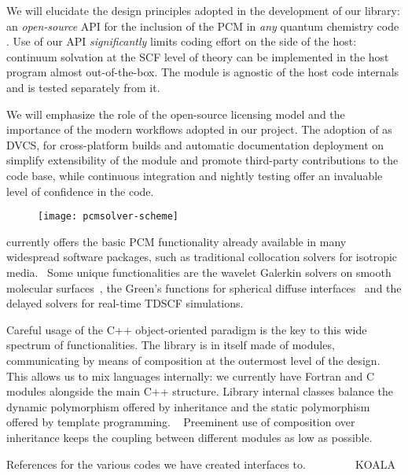We will elucidate the design principles adopted in the development of our
\pcmsolver library: an \emph{open-source} \acs{API} for the inclusion of the
PCM in \emph{any} quantum chemistry code \cite{PCMSolver}.  Use of our
\acs{API} \emph{significantly} limits coding effort on the side of the host:
continuum solvation at the \acs{SCF}
level of theory can be implemented in the host program almost out-of-the-box.  The module is
agnostic of the host code internals and is tested separately from it.

We will emphasize the role of the open-source licensing model and the
importance of the modern workflows adopted in our project.  The adoption
of \git as \acs{DVCS}, \cmake for cross-platform builds and automatic
documentation deployment on \readthedocs simplify extensibility of the
module and promote third-party contributions to the code base, while
continuous integration and nightly testing offer an invaluable level of
confidence in the code.

\begin{figure}[!htb]
  \centering
  \texttt{[image: pcmsolver-scheme]}
\end{figure}

\pcmsolver currently offers the basic PCM functionality already
available in many widespread software packages, such as traditional
collocation solvers for isotropic media.~\autocite{Tomasi2005-vm}
Some unique functionalities are the wavelet Galerkin solvers on smooth
molecular surfaces~\autocite{Weijo2010-hy, Bugeanu2015-tp}, the Green’s
functions for spherical diffuse interfaces~\autocite{DiRemigio2016-nn} and
the delayed solvers for real-time \acl{TDSCF}
simulations.~\autocite{Corni2015-pe}

Careful usage of the C++ object-oriented paradigm is the key to this
wide spectrum of functionalities. The library is in itself made of
modules, communicating by means of composition at the outermost
level of the design.
This allows us to mix languages internally: we currently have Fortran
and C modules alongside the main C++ structure.
Library internal classes balance the dynamic polymorphism offered by
inheritance and the static polymorphism offered by template programming.
~\autocite{Alexandrescu2001-bp, Sutter2004-nt, Langr2012-js}
Preeminent use of composition over inheritance keeps the coupling
between different modules as low as possible.~\autocite{Gamma1995-fd}

References for the various codes we have created interfaces to.
\psicode~\autocite{Turney2012-de}
\DIRAC~\autocite{DIRAC15}
\DALTON~\autocite{DALTON16, Aidas2013-rp}
\LSDALTON~\autocite{LSDALTON16, Aidas2013-rp}
\ReSpect~\autocite{ReSpect citation}
KOALA~\autocite{Hofener2014-ex, Hofener2016-qz}

